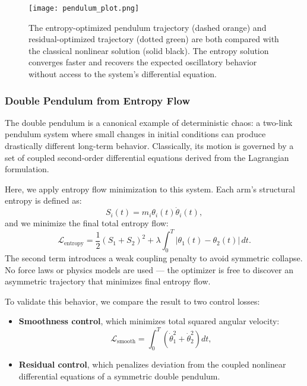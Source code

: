 \documentclass[12pt]{article}
\begin{document}
\begin{figure}[H]
\centering
\texttt{[image: pendulum\_plot.png]}
\caption{
The entropy-optimized pendulum trajectory (dashed orange) and residual-optimized trajectory (dotted green) are both compared with the classical nonlinear solution (solid black). The entropy solution converges faster and recovers the expected oscillatory behavior without access to the system’s differential equation.
}
\end{figure}


\subsubsection{Double Pendulum from Entropy Flow}

The double pendulum is a canonical example of deterministic chaos: a two-link pendulum system where small changes in initial conditions can produce drastically different long-term behavior. Classically, its motion is governed by a set of coupled second-order differential equations derived from the Lagrangian formulation.

Here, we apply entropy flow minimization to this system. Each arm’s structural entropy is defined as:
\[
S_i(t) = m_i \theta_i(t) \dot{\theta}_i(t),
\]
and we minimize the final total entropy flow:
\[
\mathcal{L}_{\text{entropy}} = \frac{1}{2} \left(S_1 + S_2\right)^2 + \lambda \int_0^T |\theta_1(t) - \theta_2(t)| \, dt.
\]
The second term introduces a weak coupling penalty to avoid symmetric collapse. No force laws or physics models are used — the optimizer is free to discover an asymmetric trajectory that minimizes final entropy flow.

To validate this behavior, we compare the result to two control losses:
\begin{itemize}
    \item \textbf{Smoothness control}, which minimizes total squared angular velocity:  
    \[
    \mathcal{L}_{\text{smooth}} = \int_0^T \left(\dot{\theta}_1^2 + \dot{\theta}_2^2\right) dt,
    \]
    \item \textbf{Residual control}, which penalizes deviation from the coupled nonlinear differential equations of a symmetric double pendulum.
\end{itemize}
\end{document}
